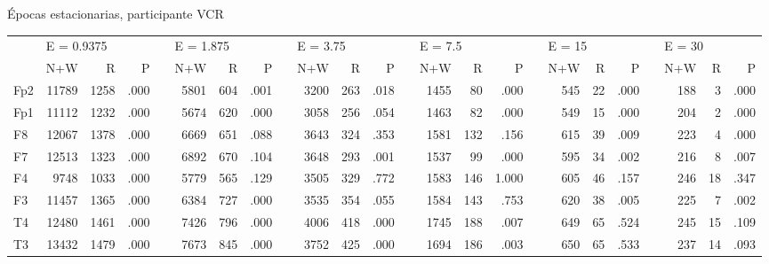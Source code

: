 \begin{SidewaysTable}
\centering
\caption{Épocas estacionarias, participante VCR}
{\small
\begin{tabular}{lrrrlrrrlrrrlrrrlrrrlrrr}
\toprule
      & \multicolumn{3}{l}{E = 0.9375} &  & \multicolumn{3}{l}{E = 1.875} &  & \multicolumn{3}{l}{E = 3.75} &  & \multicolumn{3}{l}{E = 7.5} &  & \multicolumn{3}{l}{E = 15} &  & \multicolumn{3}{l}{E = 30} \\
\cmidrule{2-4} \cmidrule{6-8} \cmidrule{10-12} \cmidrule{14-16} \cmidrule{18-20}
      & N+W       & R       & P        &  & N+W      & R       & P        &  & N+W      & R      & P        &  & N+W     & R      & P        &  & N+W     & R      & P       &  & N+W     & R     & P        \\
\midrule
Fp2   & 11789     & 1258    & .000    &  & 5801     & 604     & .001    &  & 3200     & 263    & .018    &  & 1455    & 80     & .000    &  & 545     & 22     & .000   &  & 188     & 3     & .000    \\
Fp1   & 11112     & 1232    & .000    &  & 5674     & 620     & .000    &  & 3058     & 256    & .054    &  & 1463    & 82     & .000    &  & 549     & 15     & .000   &  & 204     & 2     & .000    \\
F8    & 12067     & 1378    & .000    &  & 6669     & 651     & .088    &  & 3643     & 324    & .353    &  & 1581    & 132    & .156    &  & 615     & 39     & .009   &  & 223     & 4     & .000    \\
F7    & 12513     & 1323    & .000    &  & 6892     & 670     & .104    &  & 3648     & 293    & .001    &  & 1537    & 99     & .000    &  & 595     & 34     & .002   &  & 216     & 8     & .007    \\
F4    & 9748      & 1033    & .000    &  & 5779     & 565     & .129    &  & 3505     & 329    & .772    &  & 1583    & 146    & 1.000    &  & 605     & 46     & .157   &  & 246     & 18    & .347    \\
F3    & 11457     & 1365    & .000    &  & 6384     & 727     & .000    &  & 3535     & 354    & .055    &  & 1584    & 143    & .753    &  & 620     & 38     & .005   &  & 225     & 7     & .002    \\
T4    & 12480     & 1461    & .000    &  & 7426     & 796     & .000    &  & 4006     & 418    & .000    &  & 1745    & 188    & .007    &  & 649     & 65     & .524   &  & 245     & 15    & .109    \\
T3    & 13432     & 1479    & .000    &  & 7673     & 845     & .000    &  & 3752     & 425    & .000    &  & 1694    & 186    & .003    &  & 650     & 65     & .533   &  & 237     & 14    & .093    \\

\end{tabular}}
\end{SidewaysTable}
